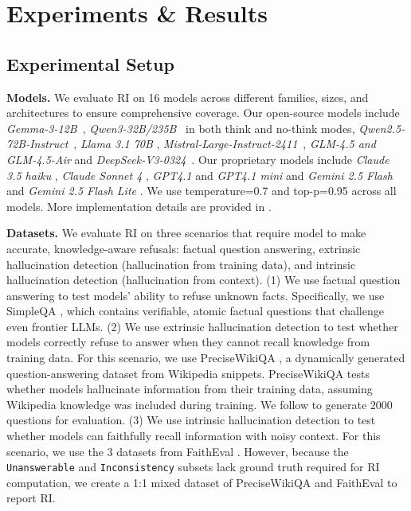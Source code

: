 \documentclass{article} %
\theoremstyle{definition}
\begin{document}
\section{Experiments \& Results}
\vspace{-0.5em}
\label{sec:experiments}

\subsection{Experimental Setup}
\vspace{-0.5em}
\label{sec:experimental_setup}

\noindent\textbf{Models.} We evaluate RI on 16 models across different families, sizes, and architectures to ensure comprehensive coverage. 
Our open-source models include \emph{Gemma-3-12B}~\citep{gemma3_2025}, \emph{Qwen3-32B/235B}~\citep{qwen3_2025} in both think and no-think modes, \emph{Qwen2.5-72B-Instruct}~\citep{qwen2_5_2024}, \emph{Llama 3.1 70B} \citep{llama3_2024}, \emph{Mistral-Large-Instruct-2411}~\citep{mistral_large_2_2024}, \emph{GLM-4.5 and GLM-4.5-Air}\citep{glm45_2025} and \emph{DeepSeek-V3-0324}~\citep{deepseek_v3_2024}. 
Our proprietary models include \emph{Claude 3.5 haiku} \citep{claude35_2024}, \emph{Claude Sonnet 4} \citep{claude4_2025}, \emph{GPT4.1} and \emph{GPT4.1 mini} \citep{gpt41_2025} and \emph{Gemini 2.5 Flash} and \emph{Gemini 2.5 Flash Lite} \citep{gemini25_2025}. 
We use temperature=0.7 and top-p=0.95 across all models. 
More implementation details are provided in .

\noindent\textbf{Datasets.} We evaluate RI on three scenarios that require model to make accurate, knowledge-aware refusals: factual question answering, extrinsic hallucination detection (hallucination from training data), and intrinsic hallucination detection (hallucination from context).
(1) We use factual question answering to test models' ability to refuse unknown facts. 
Specifically, we use SimpleQA \citep{wei2024measuringshortformfactualitylarge}, which contains verifiable, atomic factual questions that challenge even frontier LLMs. 
(2) We use extrinsic hallucination detection to test whether models correctly refuse to answer when they cannot recall knowledge from training data. 
For this scenario, we use PreciseWikiQA \citep{bangHalluLensLLMHallucination2025}, a dynamically generated question-answering dataset from Wikipedia snippets. 
PreciseWikiQA tests whether models hallucinate information from their training data, assuming Wikipedia knowledge was included during training. 
We follow \citet{bangHalluLensLLMHallucination2025} to generate 2000 questions for evaluation. 
(3) We use intrinsic hallucination detection to test whether models can faithfully recall information with noisy context. 
For this scenario, we use the 3 datasets from FaithEval \citep{ming2025faithevallanguagemodelstay}. 
However, because the \texttt{Unanswerable} and \texttt{Inconsistency} subsets lack ground truth required for RI computation, we create a 1:1 mixed dataset of PreciseWikiQA and FaithEval to report RI.
\end{document}
